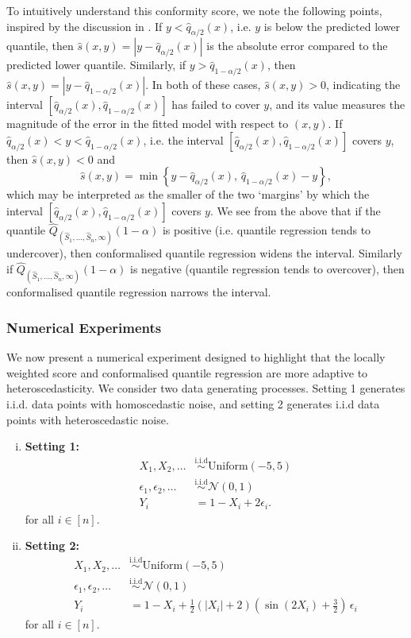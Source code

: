 \documentclass[11pt, titlepage]{article} %
\newcommand{\R}{\mathrm}
\numberwithin{equation}{section}
\theoremstyle{definition}
\numberwithin{theorem}{section}
\numberwithin{lemma}{section}
\numberwithin{corollary}{section}
\numberwithin{proposition}{section}
\numberwithin{definition}{section}
\numberwithin{remark}{section}
\begin{document}
\noindent
To intuitively understand this conformity score, we note the following points, inspired by the discussion in \cite{romano2019_CQR}. If \(y < \hat{q}_{\alpha/2}(x)\), i.e. \(y\) is below the predicted lower quantile, then \(\hat{s}(x,y) = |y - \hat{q}_{\alpha/2}(x)|\) is the absolute error compared to the predicted lower quantile. Similarly, if \(y > \hat{q}_{1-\alpha/2}(x)\), then \(\hat{s}(x,y) = |y - \hat{q}_{1-\alpha/2}(x)|.\) In both of these cases, \(\hat{s}(x,y) > 0\), indicating the interval \([\hat{q}_{\alpha/2}(x), \hat{q}_{1-\alpha/2}(x)]\) has failed to cover \(y\), and its value measures the magnitude of the error in the fitted model with respect to \((x,y)\). If \(\hat{q}_{\alpha/2}(x) < y < \hat{q}_{1-\alpha/2}(x)\), i.e. the interval \([\hat{q}_{\alpha/2}(x), \hat{q}_{1-\alpha/2}(x)]\) covers \(y\), then \(\hat{s}(x,y) < 0\) and \[\hat{s}(x,y) = \min \left\{ y - \hat{q}_{\alpha/2}(x), \, \hat{q}_{1-\alpha/2}(x) - y \right\},\] which may be interpreted as the smaller of the two `margins' by which the interval \([\hat{q}_{\alpha/2}(x), \hat{q}_{1-\alpha/2}(x)]\) covers \(y\). We see from the above that if the quantile \(\hat{Q}_{(\hat{S}_1, \ldots, \hat{S}_n, \infty)}(1-\alpha)\) is positive (i.e. quantile regression tends to undercover), then conformalised quantile regression widens the interval. Similarly if \(\hat{Q}_{(\hat{S}_1, \ldots, \hat{S}_n, \infty)}(1-\alpha)\) is negative (quantile regression tends to overcover), then conformalised quantile regression narrows the interval.

\subsubsection{Numerical Experiments}

We now present a numerical experiment designed to highlight that the locally weighted score and conformalised quantile regression are more adaptive to heteroscedasticity. We consider two data generating processes. Setting 1 generates i.i.d. data points with homoscedastic noise, and setting 2 generates i.i.d data points with heteroscedastic noise.
\begin{enumerate}[(i)]
    \item \textbf{Setting 1: } \begin{align*}
        X_1, X_2, \ldots &\overset{\R{i.i.d}}{\sim} \R{Uniform}(-5,5) \\
        \epsilon_1, \epsilon_2, \ldots &\overset{\R{i.i.d}}{\sim} \mathcal{N}(0,1) \\
        Y_i &= 1 - X_i + 2\epsilon_i. 
    \end{align*} for all \(i \in [n]\).
    \item \textbf{Setting 2: } \begin{align*}
        X_1, X_2, \ldots &\overset{\R{i.i.d}}{\sim} \R{Uniform}(-5,5) \\
        \epsilon_1, \epsilon_2, \ldots &\overset{\R{i.i.d}}{\sim} \mathcal{N}(0,1) \\
        Y_i &= 1 - X_i + \frac{1}{2}\left(|X_i| + 2\right)\left(\sin(2X_i) + \frac{3}{2}\right) \, \epsilon_i
    \end{align*} for all \(i \in [n]\).    
\end{enumerate}
\end{document}
